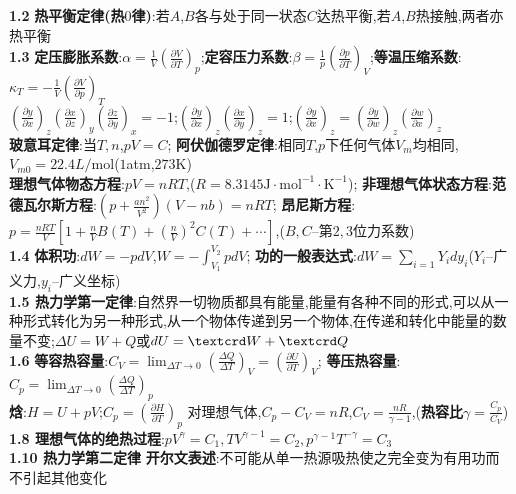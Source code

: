 \documentclass[10pt,a4paper]{article}
\begin{document}
\tiny
\begin{multicols}{2}
\noindent\textbf{1.2}
\textbf{热平衡定律(热$0$律)}:若$A$,$B$各与处于同一状态$C$达热平衡,若$A$,$B$热接触,两者亦热平衡\\
\textbf{1.3}
\textbf{定压膨胀系数}:$\alpha=\frac{1}{V}\left(\frac{\partial V}{\partial T}\right)_p$;\textbf{定容压力系数}:$\beta=\frac{1}{p}\left(\frac{\partial p}{\partial T}\right)_V$;\textbf{等温压缩系数}:$\kappa_T=-\frac{1}{V}\left(\frac{\partial V}{\partial p}\right)_T$\\
$\left(\frac{\partial y}{\partial x}\right)_z\left(\frac{\partial x}{\partial z}\right)_y\left(\frac{\partial z}{\partial y}\right)_x=-1$;$\left(\frac{\partial y}{\partial x}\right)_z\left(\frac{\partial x}{\partial y}\right)_z=1$;$\left(\frac{\partial y}{\partial x}\right)_z=\left(\frac{\partial y}{\partial w}\right)_z\left(\frac{\partial w}{\partial x}\right)_z$\\
\textbf{玻意耳定律}:当$T,n$,$pV=C$;
\textbf{阿伏伽德罗定律}:相同$T$,$p$下任何气体$V_m$均相同,$V_{m0}=22.4L/$mol($1$atm,$273$K)\\
\textbf{理想气体物态方程}:$pV=nRT$,($R=8.3145\text{J}\cdot\text{mol}^{-1}\cdot\text{K}^{-1}$);
\textbf{非理想气体状态方程}:\textbf{范德瓦尔斯方程}:$(p+\frac{an^2}{V^2})(V-nb)=nRT$;
\textbf{昂尼斯方程}:$p=\frac{nRT}{V}\left[1+\frac{n}{V}B(T)+\left(\frac{n}{V}\right)^2C(T)+\cdots\right]$,($B,C$--第$2,3$位力系数)\\
\textbf{1.4}
\textbf{体积功}:$dW=-pdV$,$W=-\int_{V_1}^{V_2}pdV$;
\textbf{功的一般表达式}:$dW=\sum_{i=1}Y_idy_i$($Y_i$--广义力,$y_i$--广义坐标)\\
\textbf{1.5 热力学第一定律}:自然界一切物质都具有能量,能量有各种不同的形式,可以从一种形式转化为另一种形式,从一个物体传递到另一个物体,在传递和转化中能量的数量不变;$\Delta U=W+Q$或$dU=\text{\textcrd}W+\text{\textcrd}Q$\\
\textbf{1.6}
\textbf{等容热容量}:$C_V=\lim_{\Delta T\rightarrow0}\left(\frac{\Delta Q}{\Delta T}\right)_V=\left(\frac{\partial U}{\partial T}\right)_V$;
\textbf{等压热容量}:$C_p=\lim_{\Delta T\rightarrow0}\left(\frac{\Delta Q}{\Delta T}\right)_p$\\
\textbf{焓}:$H=U+pV$;$C_p=\left(\frac{\partial H}{\partial T}\right)_p$\quad
对理想气体,$C_p-C_V=nR$,$C_V=\frac{nR}{\gamma-1}$,(\textbf{热容比}$\gamma=\frac{C_p}{C_V}$)\\
\textbf{1.8 理想气体的绝热过程}:$pV^{\gamma}=C_1,TV^{\gamma-1}=C_2,p^{\gamma-1}T^{-\gamma}=C_3$\\
\textbf{1.10 热力学第二定律}
\textbf{开尔文表述}:不可能从单一热源吸热使之完全变为有用功而不引起其他变化\\

\end{multicols}
\end{document}

